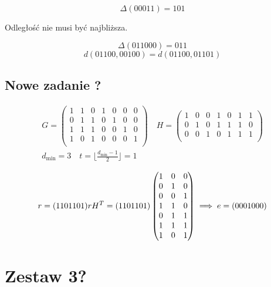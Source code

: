\documentclass[12pt]{article}
\newcommand{\floor}[1]{\lfloor #1 \rfloor}
\begin{document}
$$\Delta(00011) = 101 $$

Odległość nie musi być najbliższa.

$$\Delta(011000) = 011$$
$$d(01100,00100) = d(01100,01101) $$

\subsection*{Nowe zadanie ?} 

\begin{align*}
    G=
    \begin{pmatrix}
        1 & 1 & 0 & 1 & 0  & 0 & 0 \\
        0 & 1 & 1 & 0 & 1  & 0 & 0 \\
        1 & 1 & 1 & 0 & 0  & 1 & 0\\
        1 & 0 & 1 & 0 & 0  & 0 & 1\\
    \end{pmatrix} \quad 
   H = 
 \begin{pmatrix}
    1 & 0 & 0 & 1 & 0  & 1 & 1 \\
    0 & 1 & 0 & 1 & 1  & 1 & 0 \\
    0 & 0 & 1 & 0 & 1  & 1 & 1\\
\end{pmatrix} \\
    d_{\min} = 3 \quad t=\floor{\frac{d_{\min}-1}{2} } = 1
\end{align*}


$$
r=(110 1101) \\
rH^T = (1101101) 
    \begin{pmatrix}
        1 & 0 & 0 \\
        0 & 1 & 0 \\
        0 & 0 & 1 \\
        1 & 1 & 0 \\
        0 & 1 & 1 \\
        1 & 1 & 1 \\
        1 & 0 & 1 \\
    \end{pmatrix}  
\implies e=(0001000)
$$

\section*{Zestaw 3?} 
\end{document}
